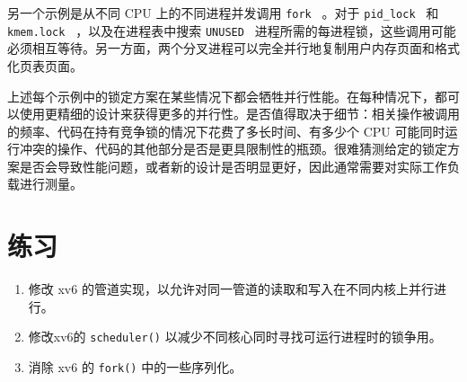 另一个示例是从不同 CPU 上的不同进程并发调用  {    \tt    fork   } 。对于  {    \tt    pid\_lock   }  和  {    \tt    kmem.lock   }  ，以及在进程表中搜索  {    \tt    UNUSED   }  进程所需的每进程锁，这些调用可能必须相互等待。另一方面，两个分叉进程可以完全并行地复制用户内存页面和格式化页表页面。  

上述每个示例中的锁定方案在某些情况下都会牺牲并行性能。在每种情况下，都可以使用更精细的设计来获得更多的并行性。是否值得取决于细节：相关操作被调用的频率、代码在持有竞争锁的情况下花费了多长时间、有多少个 CPU 可能同时运行冲突的操作、代码的其他部分是否是更具限制性的瓶颈。很难猜测给定的锁定方案是否会导致性能问题，或者新的设计是否明显更好，因此通常需要对实际工作负载进行测量。  

   \section{练习  }     

   \begin{enumerate}


   \item   修改 xv6 的管道实现，以允许对同一管道的读取和写入在不同内核上并行进行。   \item   修改xv6的   \texttt{scheduler()}   以减少不同核心同时寻找可运行进程时的锁争用。   \item   消除 xv6 的    \texttt{fork()}    中的一些序列化。  \end{enumerate}     


